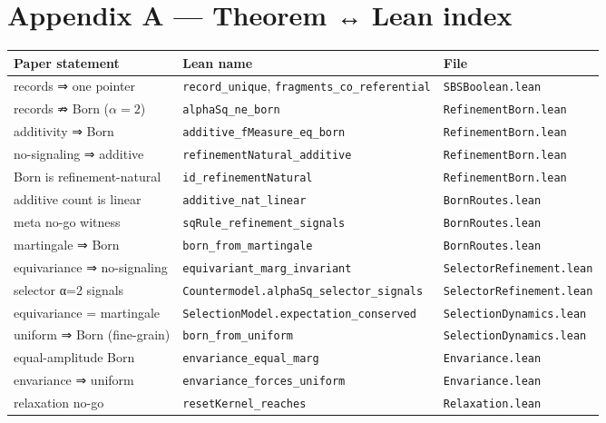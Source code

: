 \documentclass[11pt,a4paper]{article}
\begin{document}
\section{Appendix A — Theorem ↔ Lean index}

\begin{center}
\small
\begin{tabularx}{\linewidth}{|Y|Y|Y|}
\hline
\textbf{Paper statement} & \textbf{Lean name} & \textbf{File} \\
\hline
records ⇒ one pointer & \texttt{record\_unique}, \texttt{fragments\_co\_referential} & \texttt{SBSBoolean.lean} \\
\hline
records ⇏ Born ($\alpha=2$) & \texttt{alphaSq\_ne\_born} & \texttt{RefinementBorn.lean} \\
\hline
additivity ⇒ Born & \texttt{additive\_fMeasure\_eq\_born} & \texttt{RefinementBorn.lean} \\
\hline
no-signaling ⇒ additive & \texttt{refinementNatural\_additive} & \texttt{RefinementBorn.lean} \\
\hline
Born is refinement-natural & \texttt{id\_refinementNatural} & \texttt{RefinementBorn.lean} \\
\hline
additive count is linear & \texttt{additive\_nat\_linear} & \texttt{BornRoutes.lean} \\
\hline
meta no-go witness & \texttt{sqRule\_refinement\_signals} & \texttt{BornRoutes.lean} \\
\hline
martingale ⇒ Born & \texttt{born\_from\_martingale} & \texttt{BornRoutes.lean} \\
\hline
equivariance ⇒ no-signaling & \texttt{equivariant\_marg\_invariant} & \texttt{SelectorRefinement.lean} \\
\hline
selector α=2 signals & \texttt{Countermodel.alphaSq\_selector\_signals} & \texttt{SelectorRefinement.lean} \\
\hline
equivariance = martingale & \texttt{SelectionModel.expectation\_conserved} & \texttt{SelectionDynamics.lean} \\
\hline
uniform ⇒ Born (fine-grain) & \texttt{born\_from\_uniform} & \texttt{SelectionDynamics.lean} \\
\hline
equal-amplitude Born & \texttt{envariance\_equal\_marg} & \texttt{Envariance.lean} \\
\hline
envariance ⇒ uniform & \texttt{envariance\_forces\_uniform} & \texttt{Envariance.lean} \\
\hline
relaxation no-go & \texttt{resetKernel\_reaches} & \texttt{Relaxation.lean} \\

\end{tabularx}
\end{center}
\end{document}
